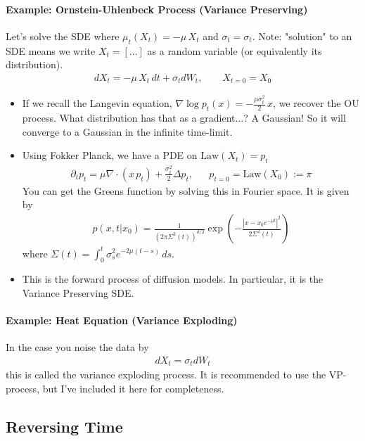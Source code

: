 \paragraph{Example: Ornstein-Uhlenbeck Process (Variance Preserving)}
Let's solve the SDE where $\mu_t(X_t) = - \mu \, X_t$ and $\sigma_t = \sigma_t$. Note: "solution" to an SDE means we write $X_t = [...]$ as a random variable (or equivalently its distribution).
\begin{align}
	dX_t = - \mu \, X_t \, dt + \sigma_t dW_t, \qquad X_{t=0} = X_0
\end{align}
\begin{itemize}
	\item If we recall the Langevin equation, $\nabla \log p_t(x) = - \frac{\mu \sigma^2_t}{2} \, x$, we recover the OU process. What distribution has that as a gradient...? A Gaussian! So it will converge to a Gaussian in the infinite time-limit.
	\item Using Fokker Planck, we have a PDE on $\text{Law}(X_t) = p_t$
	\begin{align}
		\partial_t p_t = \mu \nabla \cdot (x\, p_t) + \frac{\sigma^2_t}{2}\Delta  p_t, && p_{t=0} = \text{Law}(X_0) := \pi
	\end{align}
	You can get the Greens function by solving this in Fourier space. It is given by
	\begin{align}
		p(x, t | x_0) = \frac{1}{(2\pi \Sigma^2(t))^{d/2}} \exp \left( -\frac{|x-  x_0 e^{-\mu t}|^2}{2 \Sigma^2(t)} \right)
	\end{align}
	where $\Sigma(t) = \int_0^t \sigma_s^2 e^{-2\mu(t-s)}\,ds$.
	\item This is the forward process of diffusion models. In particular, it is the Variance Preserving SDE.
\end{itemize}
\paragraph{Example: Heat Equation (Variance Exploding)}
In the case you noise the data by
\begin{align}
	dX_t = \sigma_t dW_t
\end{align}
this is called the variance exploding process. It is recommended to use the VP-process, but I've included it here for completeness.

\subsection{Reversing Time}

